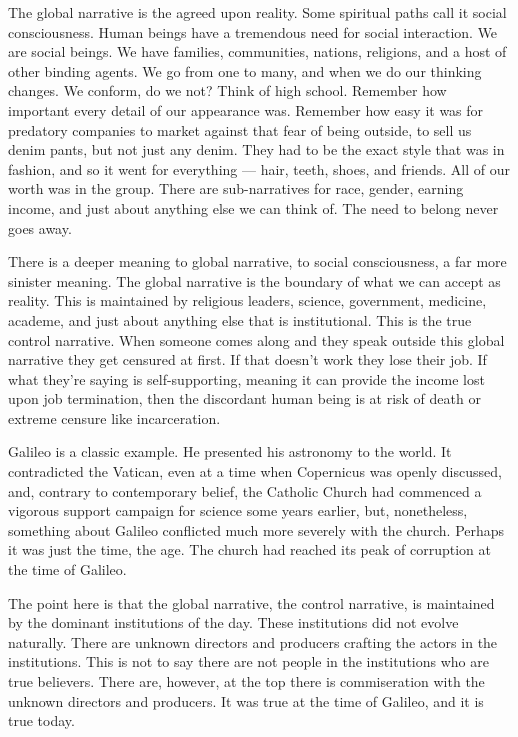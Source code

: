 \documentclass[letterpaper,11pt,twoside,titlepage,onecolumn,openany]{book}
\begin{document}
The global narrative is the agreed upon reality. Some spiritual paths
call it social consciousness. Human beings have a tremendous need for
social interaction. We are social beings. We have families, communities,
nations, religions, and a host of other binding agents. We go from one
to many, and when we do our thinking changes. We conform, do we not?
Think of high school. Remember how important every detail of our
appearance was. Remember how easy it was for predatory companies to
market against that fear of being outside, to sell us denim pants, but
not just any denim. They had to be the exact style that was in fashion,
and so it went for everything --- hair, teeth, shoes, and friends. All
of our worth was in the group. There are sub-narratives for race,
gender, earning income, and just about anything else we can think of.
The need to belong never goes away.

There is a deeper meaning to global narrative, to social consciousness,
a far more sinister meaning. The global narrative is the boundary of
what we can accept as reality. This is maintained by religious leaders,
science, government, medicine, academe, and just about anything else
that is institutional. This is the true control narrative. When someone
comes along and they speak outside this global narrative they get
censured at first. If that doesn't work they lose their job. If what
they're saying is self-supporting, meaning it can provide the income
lost upon job termination, then the discordant human being is at risk of
death or extreme censure like incarceration.

Galileo is a classic example. He presented his astronomy to the world.
It contradicted the Vatican, even at a time when Copernicus was openly
discussed, and, contrary to contemporary belief, the Catholic Church had
commenced a vigorous support campaign for science some years earlier,
but, nonetheless, something about Galileo conflicted much more severely
with the church. Perhaps it was just the time, the age. The church had
reached its peak of corruption at the time of Galileo.

The point here is that the global narrative, the control narrative, is
maintained by the dominant institutions of the day. These institutions
did not evolve naturally. There are unknown directors and producers
crafting the actors in the institutions. This is not to say there are
not people in the institutions who are true believers. There are,
however, at the top there is commiseration with the unknown directors
and producers. It was true at the time of Galileo, and it is true today.
\end{document}
